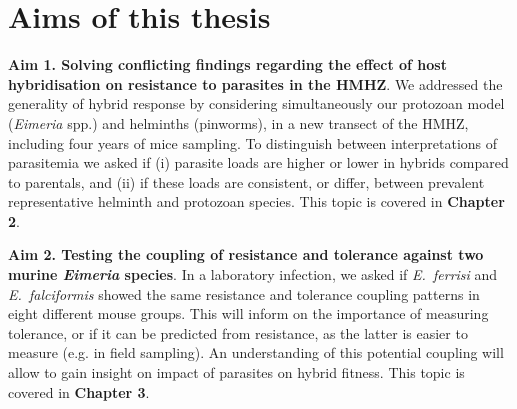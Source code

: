 \section{Aims of this thesis}
\textbf{Aim 1. Solving conflicting findings regarding the effect of host hybridisation on resistance to parasites in the HMHZ}. We addressed the generality of hybrid response by considering simultaneously our protozoan model (\textit{Eimeria} spp.) and helminths (pinworms), in a new transect of the HMHZ, including four years of mice sampling. To distinguish between interpretations of parasitemia we asked if (i) parasite loads are higher or lower in hybrids compared to parentals, and (ii) if these loads are consistent, or differ, between prevalent representative helminth and protozoan species. This topic is covered in \textbf{Chapter 2}.
\par
\textbf{Aim 2. Testing the coupling of resistance and tolerance against two murine \textit{Eimeria} species}. In a laboratory infection, we asked if \textit{E.~ferrisi} and \textit{E.~falciformis} showed the same resistance and tolerance coupling patterns in eight different mouse groups. This will inform on the importance of measuring tolerance, or if it can be predicted from resistance, as the latter is easier to measure (e.g. in field sampling). An understanding of this potential coupling will allow to gain insight on impact of parasites on hybrid fitness. This topic is covered in \textbf{Chapter 3}.
